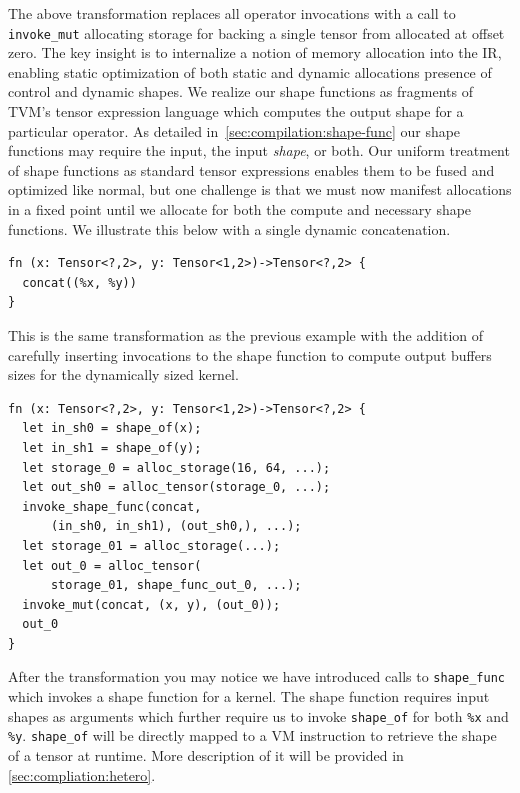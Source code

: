 The above transformation replaces all operator invocations with a call to \verb|invoke_mut| allocating storage
for backing a single tensor from allocated at offset zero.
The key insight is to internalize a notion of memory allocation into the IR, enabling static optimization of
both static and dynamic allocations presence of control and dynamic shapes. We realize our shape functions as fragments of TVM's tensor expression language which computes the output shape for a particular operator. As detailed in~\autoref{sec:compilation:shape-func} our shape functions may require the input, the input \textit{shape}, or both.
Our uniform treatment of shape functions as standard tensor expressions enables them to be fused and optimized like normal, but one challenge is that we must now manifest allocations in a fixed point until we allocate for both the compute and necessary shape functions. We illustrate this below with a single dynamic concatenation.

\begin{lstlisting}
fn (x: Tensor<?,2>, y: Tensor<1,2>)->Tensor<?,2> {
  concat((%x, %y))
}
\end{lstlisting}

This is the same transformation as the previous example with the addition of carefully inserting
invocations to the shape function to compute output buffers sizes for the dynamically sized kernel.

\begin{lstlisting}
fn (x: Tensor<?,2>, y: Tensor<1,2>)->Tensor<?,2> {
  let in_sh0 = shape_of(x);
  let in_sh1 = shape_of(y);
  let storage_0 = alloc_storage(16, 64, ...);
  let out_sh0 = alloc_tensor(storage_0, ...);
  invoke_shape_func(concat,
      (in_sh0, in_sh1), (out_sh0,), ...);
  let storage_01 = alloc_storage(...);
  let out_0 = alloc_tensor(
      storage_01, shape_func_out_0, ...);
  invoke_mut(concat, (x, y), (out_0));
  out_0
}
\end{lstlisting}

After the transformation you may notice we have introduced calls to \verb|shape_func| which invokes a shape function for a kernel. The shape function requires input shapes as arguments which further require us to invoke \verb|shape_of| for both \verb|%x| and \verb|%y|. \verb|shape_of| will be directly mapped to a VM instruction to retrieve the shape of a tensor at runtime. More description of it will be provided in \autoref{sec:compliation:hetero}.

